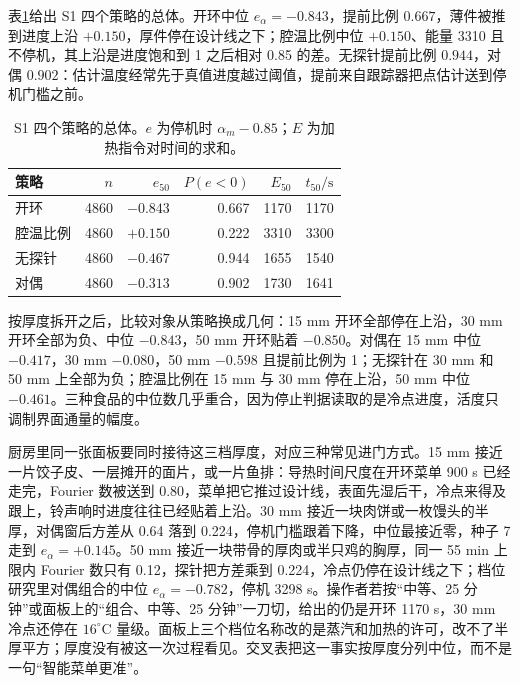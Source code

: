 表\ref{tab:s1}给出 S1 四个策略的总体。开环中位 \(e_{\alpha}=-0.843\)，提前比例 \(0.667\)，薄件被推到进度上沿 \(+0.150\)，厚件停在设计线之下；腔温比例中位 \(+0.150\)、能量 3310 且不停机，其上沿是进度饱和到 1 之后相对 0.85 的差。无探针提前比例 \(0.944\)，对偶 \(0.902\)：估计温度经常先于真值进度越过阈值，提前来自跟踪器把点估计送到停机门槛之前。

\begin{table}[htbp]
\centering
\caption{S1 四个策略的总体。\(e\) 为停机时 \(\alpha_m-0.85\)；\(E\) 为加热指令对时间的求和。}
\label{tab:s1}
\begin{tabular}{lrrrrr}
\toprule
策略 & \(n\) & \(e_{50}\) & \(P(e<0)\) & \(E_{50}\) & \(t_{50}/\mathrm{s}\) \\
\midrule
开环 & 4860 & \(-0.843\) & 0.667 & 1170 & 1170 \\
腔温比例 & 4860 & \(+0.150\) & 0.222 & 3310 & 3300 \\
无探针 & 4860 & \(-0.467\) & 0.944 & 1655 & 1540 \\
对偶 & 4860 & \(-0.313\) & 0.902 & 1730 & 1641 \\
\bottomrule
\end{tabular}
\end{table}

按厚度拆开之后，比较对象从策略换成几何：15 mm 开环全部停在上沿，30 mm 开环全部为负、中位 \(-0.843\)，50 mm 开环贴着 \(-0.850\)。对偶在 15 mm 中位 \(-0.417\)，30 mm \(-0.080\)，50 mm \(-0.598\) 且提前比例为 1；无探针在 30 mm 和 50 mm 上全部为负；腔温比例在 15 mm 与 30 mm 停在上沿，50 mm 中位 \(-0.461\)。三种食品的中位数几乎重合，因为停止判据读取的是冷点进度，活度只调制界面通量的幅度。

厨房里同一张面板要同时接待这三档厚度，对应三种常见进门方式。15 mm 接近一片饺子皮、一层摊开的面片，或一片鱼排：导热时间尺度在开环菜单 900 s 已经走完，Fourier 数被送到 0.80，菜单把它推过设计线，表面先湿后干，冷点来得及跟上，铃声响时进度往往已经贴着上沿。30 mm 接近一块肉饼或一枚馒头的半厚，对偶窗后方差从 0.64 落到 0.224，停机门槛跟着下降，中位最接近零，种子 7 走到 \(e_{\alpha}=+0.145\)。50 mm 接近一块带骨的厚肉或半只鸡的胸厚，同一 55 min 上限内 Fourier 数只有 0.12，探针把方差乘到 0.224，冷点仍停在设计线之下；档位研究里对偶组合的中位 \(e_{\alpha}=-0.782\)，停机 3298 s。操作者若按“中等、25 分钟”或面板上的“组合、中等、25 分钟”一刀切，给出的仍是开环 1170 s，30 mm 冷点还停在 \(16^\circ\mathrm{C}\) 量级。面板上三个档位名称改的是蒸汽和加热的许可，改不了半厚平方；厚度没有被这一次过程看见。交叉表把这一事实按厚度分列中位，而不是一句“智能菜单更准”。

